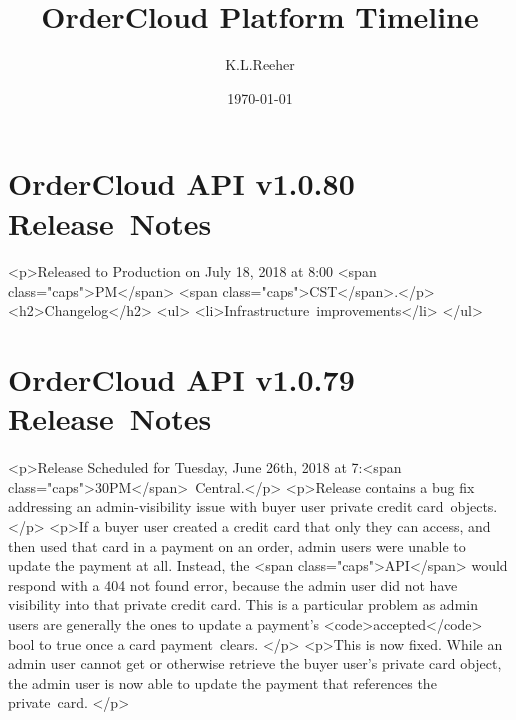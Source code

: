 \documentclass{memoir}%
\title{OrderCloud Platform Timeline}%
\author{K.L.Reeher}%
\date{\today}%
\begin{document}
%
\normalsize%
\maketitle%
\section*{OrderCloud API v1.0.80 Release~Notes}%
\paragraph*{}%

%
\paragraph*{}%
<p>Released to Production on July 18, 2018 at 8:00 <span class="caps">PM</span> <span class="caps">CST</span>.</p>\newline%
<h2>Changelog</h2>\newline%
<ul>\newline%
<li>Infrastructure~improvements</li>\newline%
</ul>

%
\section*{OrderCloud API v1.0.79 Release~Notes}%
\paragraph*{}%

%
\paragraph*{}%
<p>Release Scheduled for Tuesday, June 26th, 2018 at 7:<span class="caps">30PM</span>~Central.</p>\newline%
<p>Release contains a bug fix addressing an admin{-}visibility issue with buyer user private credit card~objects. </p>\newline%
<p>If a buyer user created a credit card that only they can access, and then used that card in a payment on an order, admin users were unable to update the payment at all. Instead, the <span class="caps">API</span> would respond with a 404 not found error, because the admin user did not have visibility into that private credit card. This is a particular problem as admin users are generally the ones to update a payment’s <code>accepted</code> bool to true once a card payment~clears. </p>\newline%
<p>This is now fixed. While an admin user cannot get or otherwise retrieve the buyer user’s private card object, the admin user is now able to update the payment that references the private~card. </p>
\end{document}
